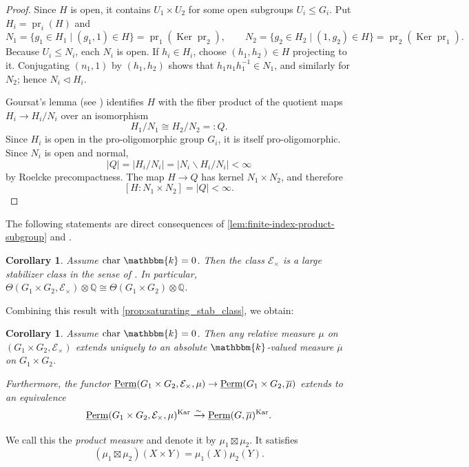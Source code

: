 \documentclass[11pt,a4paper]{amsart}
\theoremstyle{plain}%
\newtheorem{corollary}[lemma]{Corollary}
\theoremstyle{definition}
\theoremstyle{remark}
\newcommand{\Ker}{\operatorname{Ker}}
\newcommand{\Perm}{\underline{{\rm Perm}}}
\newcommand{\kk}{\mathbbm{k}}
\newcommand{\Kar}{\mathrm{Kar}}
\begin{document}
\begin{proof}
Since $H$ is open, it contains $U_1\times U_2$ for some open subgroups $U_i\leq G_i$. Put $H_i=\operatorname{pr}_i(H)$ and
\[N_1=\{g_1\in H_1\mid(g_1,1)\in H\}=\operatorname{pr}_1(\Ker \operatorname{pr}_2),\qquad
N_2=\{g_2\in H_2\mid(1,g_2)\in H\}=\operatorname{pr}_2(\Ker \operatorname{pr}_1).\]
Because $U_i\leq N_i$, each $N_i$ is open. If $h_i\in H_i$, choose $(h_1,h_2)\in H$ projecting to it. Conjugating $(n_1,1)$ by $(h_1,h_2)$ shows that $h_1n_1h_1^{-1}\in N_1$, and similarly for $N_2$; hence $N_i\triangleleft H_i$.

Goursat's lemma (see \cite[Theorem 2.1]{Bauer-Sen-Zvengrowski}) identifies $H$ with the fiber product of the quotient maps $H_i\to H_i/N_i$ over an isomorphism
\[ H_1/N_1\cong H_2/N_2=:Q.\] Since $H_i$ is open in the pro-oligomorphic group $G_i$, it is itself pro-oligomorphic. Since $N_i$ is open and normal,
\[|Q|=|H_i/N_i|=|N_i\backslash H_i/N_i|<\infty\] by Roelcke precompactness. The map $H\to Q$ has kernel $N_1\times N_2$, and therefore \[[H:N_1\times N_2]=|Q|<\infty.\]
\end{proof}
The following statements are direct consequences of \cref{lem:finite-index-product-subgroup} and \cite[Section 3.4(d)]{HS-oligomorphic}.
\begin{corollary}\label{cor:prod_is_large_stab_class}
Assume $\mathrm{char}~\kk=0$. Then the class $\mathcal E_{\times}$ is a large stabilizer class in the sense of \cite[Section 3.4(d)]{HS-oligomorphic}. In particular, $ \Theta(G_1\times G_2, \mathcal E_{\times})\otimes \mathbb{Q} \cong \Theta(G_1\times G_2)\otimes \mathbb{Q} $.
 
\end{corollary}
Combining this result with \cref{prop:saturating_stab_class}, we obtain:
\begin{corollary}\label{cor:prod_saturating}
       Assume $\mathrm{char}~\kk = 0$. Then any relative measure $\mu$ on $(G_1\times G_2, \mathcal{E}_{\times})$ extends uniquely to an absolute $\kk$-valued measure $\overline{\mu}$ on $G_1\times G_2$. 
       
       Furthermore, the functor $\Perm(G_1\times G_2, \mathcal{E}_{\times}, \mu) \to \Perm(G_1\times G_2, \overline{\mu})$ extends to an equivalence
       $$\Perm(G_1\times G_2, \mathcal{E}_{\times}, \mu)^{\Kar} \xrightarrow{\sim} \Perm(G, \overline{\mu})^{\Kar}.$$ 
\end{corollary}


We call this the \emph{product measure} and denote it by $\mu_1\boxtimes\mu_2$. It satisfies
\[ (\mu_1\boxtimes\mu_2)(X\times Y)=\mu_1(X)\mu_2(Y). \]
\end{document}
